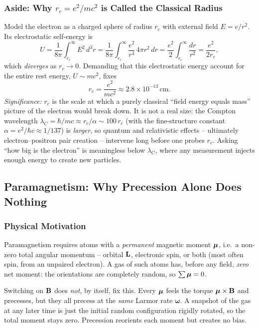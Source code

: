\subsubsection*{Aside: Why $r_c=e^2/mc^2$ is Called the Classical Radius}
Model the electron as a charged sphere of radius $r_c$ with external field $E=e/r^2$. Its
electrostatic self-energy is
\begin{equation}\label{eq:lec19-selfenergy}
  U=\frac{1}{8\pi}\int_{r_c}^{\infty}E^2\,d^3r
   =\frac{1}{8\pi}\int_{r_c}^{\infty}\frac{e^2}{r^4}\,4\pi r^2\,dr
   =\frac{e^2}{2}\int_{r_c}^{\infty}\frac{dr}{r^2}=\frac{e^2}{2r_c},
\end{equation}
which \emph{diverges} as $r_c\to0$. Demanding that this electrostatic energy account for
the entire rest energy, $U\sim mc^2$, fixes
\begin{equation}\label{eq:lec19-rc}
  \boxed{r_c=\frac{e^2}{mc^2}\approx2.8\times10^{-13}\,\mathrm{cm}.}
\end{equation}
\textit{Significance:} $r_c$ is the scale at which a purely classical ``field energy
equals mass'' picture of the electron would break down. It is not a real size: the Compton
wavelength $\lambda_C=\hbar/mc\approx r_c/\alpha\sim100\,r_c$ (with the fine-structure
constant $\alpha=e^2/\hbar c\approx1/137$) is \emph{larger}, so quantum and relativistic
effects -- ultimately electron--positron pair creation -- intervene long before one probes
$r_c$. Asking ``how big is the electron'' is meaningless below $\lambda_C$, where any
measurement injects enough energy to create new particles.

\subsection{Paramagnetism: Why Precession Alone Does Nothing}\label{subsec:lec19-para-setup}

\subsubsection*{Physical Motivation}
Paramagnetism requires atoms with a \emph{permanent} magnetic moment $\boldsymbol{\mu}$, i.e.\ a
non-zero total angular momentum -- orbital $\mathbf{L}$, electronic spin, or both (most
often spin, from an unpaired electron). A gas of such atoms has, before any field,
\emph{zero} net moment: the orientations are completely random, so $\sum\boldsymbol{\mu}=0$.

Switching on $\mathbf{B}$ does \emph{not}, by itself, fix this. Every $\boldsymbol{\mu}$ feels the torque
$\boldsymbol{\mu}\times\mathbf{B}$ and precesses, but they all precess at the \emph{same} Larmor rate
$\boldsymbol{\omega}$. A snapshot of the gas at any later time is just the initial random
configuration rigidly rotated, so the total moment stays zero. Precession reorients each
moment but creates no bias.


